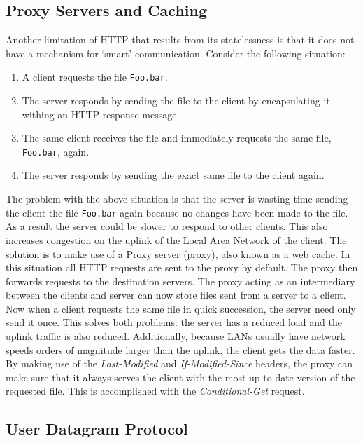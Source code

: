 \documentclass[10pt,twocolumn]{witseiepaper}
\begin{document}
	\subsection{Proxy Servers and Caching}
	\label{sec:proxy}
	Another limitation of HTTP that results from its statelessness is that it does not have a mechanism for `smart' communication. Consider the following situation:

	\begin{enumerate}
		\item A client requests the file \texttt{Foo.bar}.
		\item The server responds by sending the file to the client by encapsulating it withing an HTTP response message.
		\item The same client receives the file and immediately requests the same file, \texttt{Foo.bar}, again.
		\item The server responds by sending the exact same file to the client again.
	\end{enumerate} 

	The problem with the above situation is that the server is wasting time sending the client the file \texttt{Foo.bar} again because no changes have been made to the file. As a result the server could be slower to respond to other clients. This also increases congestion on the uplink of the Local Area Network of the client. The solution is to make use of a Proxy server (proxy), also known as a web cache. In this situation all HTTP requests are sent to the proxy by default. The proxy then forwards requests to the destination servers. The proxy acting as an intermediary between the clients and server can now store files sent from a server to a client. Now when a client requests the same file in quick succession, the server need only send it once. This solves both problems: the server has a reduced load and the uplink traffic is also reduced. Additionally, because LANs usually have network speeds orders of magnitude larger than the uplink, the client gets the data faster. By making use of the \emph{Last-Modified} and \emph{If-Modified-Since} headers, the proxy can make sure that it always serves the client with the most up to date version of the requested file. This is accomplished with the \emph{Conditional-Get} request. 	

	\subsection{User Datagram Protocol}
\end{document}
